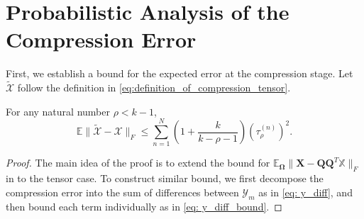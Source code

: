 \section{Probabilistic Analysis of the Compression Error}
First, we establish a bound for the expected error at the compression stage. Let $\tilde{\mathscr{X}}$ follow the definition in \eqref{eq:definition_of_compression_tensor}.
\begin{lem}
\label{lemma: compression_error}
For any natural number $\rho<k-1$,
\begin{equation}
\mathbb{E}  \|\tilde{\mathscr{X}} - \mathscr{X}\|_F \le \sum_{n=1}^N \left(1+\frac{k}{k-\rho-1}\right)(\tau^{(n)}_\rho)^2. 
\end{equation}

\begin{proof}
The main idea of the proof is to extend the bound for $\mathbb{E}_\mathbf{\Omega}\| \mathbf{X} - \mathbf{Q}\mathbf{Q}^T\mathbb{X}\|_F$ in \cite{halko2011finding} to the tensor case. To construct similar bound, we first decompose the compression error into the sum of differences between $\mathscr{Y}_m$ as in \eqref{eq: y_diff}, and then bound each term individually as in \eqref{eq: y_diff_bound}.


\end{proof}
\end{lem}

